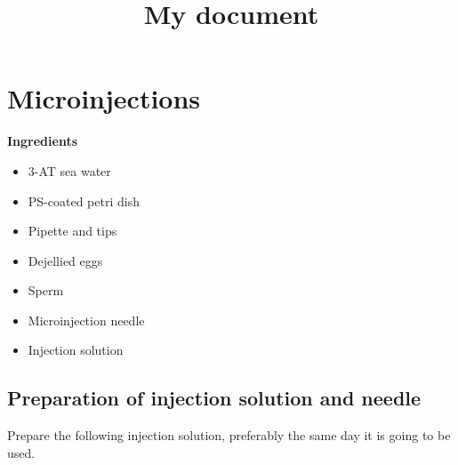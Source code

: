 \documentclass[
  letterpaper,
  DIV=11,
  numbers=noendperiod]{scrartcl}
\title{My document}
\author{}
\date{}
\providecommand{\tightlist}{%
  \setlength{\itemsep}{0pt}\setlength{\parskip}{0pt}}\usepackage{longtable,booktabs,array}
\renewcommand*\contentsname{Table of contents}
\newcommand\contentsname{Table of contents}
\begin{document}
\maketitle
\ifdefined\Shaded\renewenvironment{Shaded}{\begin{tcolorbox}[boxrule=0pt, enhanced, frame hidden, interior hidden, sharp corners, breakable, borderline west={3pt}{0pt}{shadecolor}]}{\end{tcolorbox}}\fi

\renewcommand*\contentsname{Table of contents}
{
\hypersetup{linkcolor=}
\setcounter{tocdepth}{3}
\tableofcontents
}
\hypertarget{microinjections}{%
\section*{Microinjections}\label{microinjections}}

\begin{tcolorbox}[enhanced jigsaw, breakable, colback=white, opacityback=0, arc=.35mm, colframe=quarto-callout-tip-color-frame, rightrule=.15mm, bottomrule=.15mm, toprule=.15mm, left=2mm, leftrule=.75mm]

\textbf{Ingredients}\vspace{2mm}

\begin{itemize}
\tightlist
\item
  3-AT sea water
\item
  PS-coated petri dish
\item
  Pipette and tips
\item
  Dejellied eggs
\item
  Sperm
\item
  Microinjection needle
\item
  Injection solution
\end{itemize}

\end{tcolorbox}

\hypertarget{preparation-of-injection-solution-and-needle}{%
\subsection{Preparation of injection solution and
needle}\label{preparation-of-injection-solution-and-needle}}

Prepare the following injection solution, preferably the same day it is
going to be used.
\end{document}
